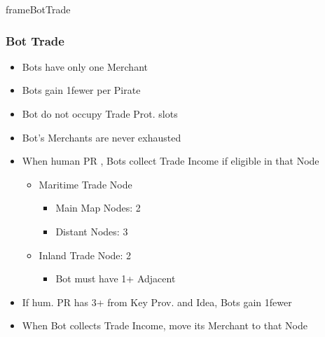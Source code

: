 \documentclass[10pt]{article}
\begin{document}
\begin{dynamiccontents*}{frameBotTrade}
	\botrules
	\subsubsection*{Bot Trade }
	\begin{itemize}
		\item Bots have only one Merchant
		\item Bots gain 1\botpower fewer per Pirate
		\item Bot \ships do not occupy Trade Prot. slots
		\item Bot's Merchants are never exhausted
	\end{itemize}
	\begin{itemize}
		\item When human PR , Bots collect Trade Income if eligible in that Node
		\begin{itemize}
			\item Maritime Trade Node
			\begin{itemize}
				\item Main Map Nodes: 2\botpower
				\item Distant Nodes: 3\botpower
			\end{itemize}
			\item Inland Trade Node: 2\botpower
			\begin{itemize}
				\item Bot must have 1+ Adjacent \town
			\end{itemize}
		\end{itemize}
		\item If hum. PR has 3+ \tradepower from Key Prov. and  Idea, Bots gain 1\botpower fewer
		\item When Bot collects Trade Income, move its Merchant to that Node
	\end{itemize}
\end{dynamiccontents*}
\end{document}
